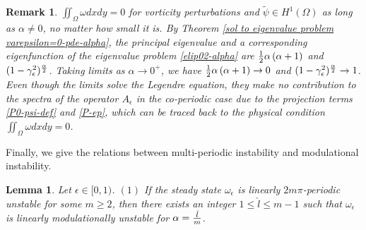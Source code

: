 \documentclass[1 [leqno, 11pt]{amsart}
\numberwithin{equation}{section}
\let\ep=\epsilon
\newtheorem{lemma}[Theorem]{Lemma}
\newtheorem{remark}[Theorem]{Remark}
\begin{document}
\begin{CJK*}{GBK}{song}
\begin{remark}
  $\iint_\Omega \omega dxdy=0$ for  vorticity perturbations and $\tilde \psi\in H^1(\Omega)$   as long as $\alpha\neq0$, no matter how small it is.
By Theorem \ref{sol to eigenvalue problem varepsilon=0-pde-alpha}, the principal eigenvalue and a corresponding eigenfunction  of the eigenvalue problem \eqref{elip02-alpha} are
${1\over2}\alpha\left(\alpha+1\right)$ and
$(1-\gamma_\ep^2)^{\alpha\over2}$. Taking limits as $\alpha\to0^+$, we have ${1\over2}\alpha\left(\alpha+1\right)\to 0$ and
$(1-\gamma_\ep^2)^{\alpha\over2}\to1$.  Even though the limits solve the Legendre equation, they make no contribution to the spectra of the operator $ A_\ep$ in the co-periodic case due to  the projection terms \eqref{P0-psi-def} and \eqref{P-ep}, which can be traced back to the physical condition $\iint_\Omega \omega dxdy=0$.
\fi


\end{remark}
Finally, we give the relations between multi-periodic instability and modulational instability.
\begin{lemma}\label{multi-periodic-modulation} Let $\ep\in[0,1)$.
$(1)$ If the steady state $\omega_\ep$ is linearly  $2m\pi$-periodic unstable for some $m\geq2$, then there exists an integer  $1\leq\hat l\leq m-1$ such that $\omega_\ep$ is linearly modulationally unstable
for $\alpha={\hat l\over m}$.


\end{lemma}
\end{CJK*}
\end{document}
